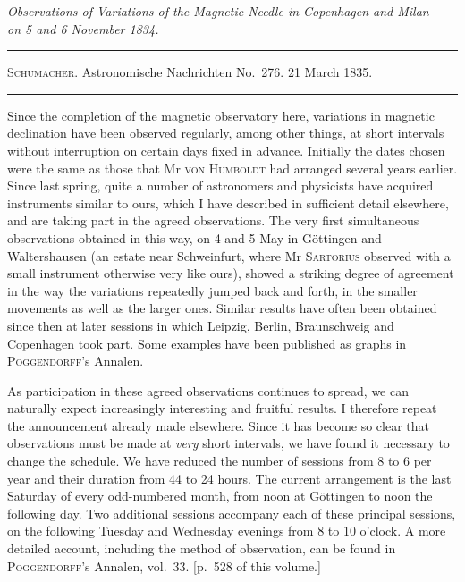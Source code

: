 \begin{center}\itshape
Observations of Variations of the Magnetic Needle in Copenhagen and Milan\\
on 5 and 6 November 1834.
\end{center}
\begin{center}
\hrule\vspace{2mm}
\textsc{Schumacher}. Astronomische Nachrichten No.\ 276. 21 March 1835.
\vspace{2mm}\hrule\vspace{5mm}
\end{center}
Since the completion of the magnetic observatory here, variations in magnetic declination have been observed regularly, among other things, at short intervals without interruption on certain days fixed in advance. Initially the dates chosen were the same as those that Mr \textsc{von Humboldt} had arranged several years earlier. Since last spring, quite a number of astronomers and physicists have acquired instruments similar to ours, which I have described in sufficient detail elsewhere, and are taking part in the agreed observations. The very first simultaneous observations obtained in this way, on 4 and 5 May in Göttingen and Waltershausen (an estate near Schweinfurt, where Mr \textsc{Sartorius} observed with a small instrument otherwise very like ours), showed a striking degree of agreement in the way the variations repeatedly jumped back and forth, in the smaller movements as well as the larger ones. Similar results have often been obtained since then at later sessions in which Leipzig, Berlin, Braunschweig and Copenhagen took part. Some examples have been published as graphs in \textsc{Poggendorff}'s Annalen.

As participation in these agreed observations continues to spread, we can naturally expect increasingly interesting and fruitful results. I therefore repeat the announcement already made elsewhere. Since it has become so clear that observations must be made at \textit{very} short intervals, we have found it necessary to change the schedule. We have reduced the number of sessions from 8 to 6 per year and their duration from 44 to 24 hours. The current arrangement is the last Saturday of every odd-numbered month, from noon at Göttingen to noon the following day. Two additional sessions accompany each of these principal sessions, on
the following Tuesday and Wednesday evenings from 8 to 10 o'clock. A more detailed account, including the method of observation, can be found in \textsc{Poggendorff}'s Annalen, vol.\ 33. [p.\ 528 of this volume.]

